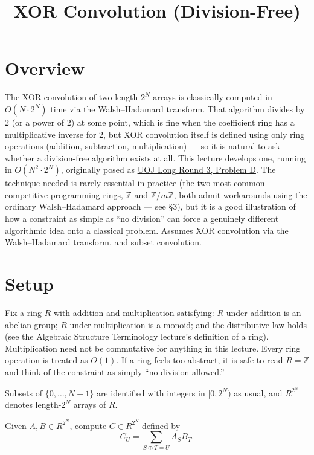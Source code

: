 \documentclass[11pt]{article}
\title{XOR Convolution (Division-Free)}
\author{}
\date{}
\begin{document}
\thispagestyle{fancy}


\section{Overview}
The XOR convolution of two length-$2^N$ arrays is classically computed
in $O(N\cdot 2^N)$ time via the Walsh--Hadamard transform. That
algorithm divides by $2$ (or a power of $2$) at some point, which is
fine when the coefficient ring has a multiplicative inverse for $2$, but
XOR convolution itself is defined using only ring operations (addition,
subtraction, multiplication) --- so it is natural to ask whether a
division-free algorithm exists at all. This lecture develops one,
running in $O(N^2\cdot 2^N)$, originally posed as
\href{https://uoj.ac/contest/103/problem/1015}{UOJ Long Round 3,
Problem D}. The technique needed is rarely essential in practice (the
two most common competitive-programming rings, $\mathbb{Z}$ and
$\mathbb{Z}/m\mathbb{Z}$, both admit workarounds using the ordinary
Walsh--Hadamard approach --- see \S3), but it is a good illustration of
how a constraint as simple as ``no division'' can force a genuinely
different algorithmic idea onto a classical problem. Assumes XOR
convolution via the Walsh--Hadamard transform, and subset convolution.

\section{Setup}
Fix a ring $R$ with addition and multiplication satisfying: $R$ under
addition is an abelian group; $R$ under multiplication is a monoid; and
the distributive law holds (see the Algebraic Structure Terminology
lecture's definition of a ring). Multiplication need not be commutative
for anything in this lecture. Every ring operation is treated as
$O(1)$. If a ring feels too abstract, it is safe to read $R=\mathbb{Z}$
and think of the constraint as simply ``no division allowed.''

Subsets of $\{0,\ldots,N-1\}$ are identified with integers in
$[0,2^N)$ as usual, and $R^{2^N}$ denotes length-$2^N$ arrays of $R$.

\begin{definitionbox}[Problem 1]
Given $A,B \in R^{2^N}$, compute $C \in R^{2^N}$ defined by
\[
  C_U = \sum_{S \oplus T = U} A_SB_T.
\]
\end{definitionbox}
\end{document}
